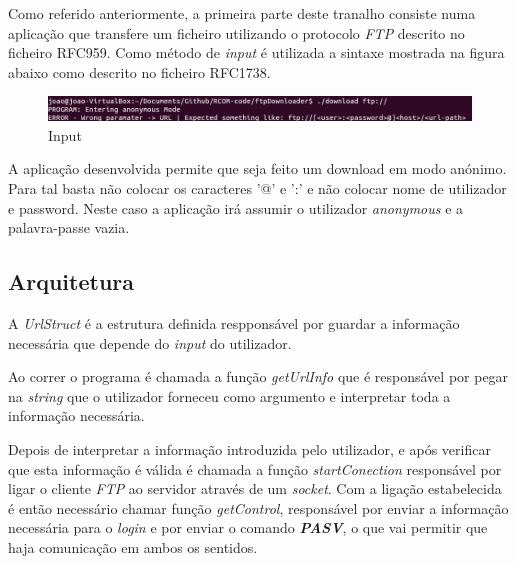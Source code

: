 \documentclass[a4paper]{article}
\begin{document}
	Como referido anteriormente, a primeira parte deste tranalho consiste numa aplicação que transfere um ficheiro utilizando o protocolo \textit{FTP} descrito no ficheiro RFC959. Como método de \textit{input} é utilizada a sintaxe mostrada na figura abaixo como descrito no ficheiro RFC1738.

	\begin{figure}[H]
  	\includegraphics[width=\linewidth]{consoleScreenshot1.png}
  	\caption{Input}
  	\label{fig:input}
	\end{figure}

	A aplicação desenvolvida permite que seja feito um download em modo anónimo. Para tal basta não colocar os caracteres '@' e ':' e não colocar nome de utilizador e password. Neste caso a aplicação irá assumir o utilizador \textit{anonymous} e a palavra-passe vazia.

	\subsection{Arquitetura}

	A \textit{UrlStruct} é a estrutura definida respponsável por guardar a informação necessária que depende do \textit{input} do utilizador.

	
	\normalsize

	Ao correr o programa é chamada a função \textit{getUrlInfo} que é responsável por pegar na \textit{string} que o utilizador forneceu como argumento e interpretar toda a informação necessária.

	
	\normalsize

	Depois de interpretar a informação introduzida pelo utilizador, e após verificar que esta informação é válida é chamada a função \textit{startConection} responsável por ligar o cliente \textit{FTP} ao servidor através de um \textit{socket}. Com a ligação estabelecida é então necessário chamar função \textit{getControl}, responsável por enviar a informação necessária para o \textit{login} e por enviar o comando \textbf{\textit{PASV}}, o que vai permitir que haja comunicação em ambos os sentidos.

	
	\normalsize
\end{document}
